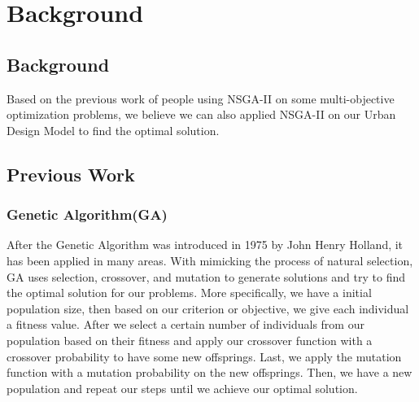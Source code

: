 \chapter{Background}
\label{chap:background}

\section{Background}
Based on the previous work of people using NSGA-II on some multi-objective optimization problems\cite{Magnier_2010_Multiobjective}, we believe we can also applied NSGA-II on our Urban Design Model to find the optimal solution. 

\section{Previous Work}

\subsection{Genetic Algorithm(GA)}
After the Genetic Algorithm was introduced in 1975 by John Henry Holland\cite{Holland_1975_Book}, it has been applied in many areas. With mimicking the process of natural selection, GA uses selection, crossover, and mutation to generate solutions and try to find the optimal solution for our problems. More specifically, we have a initial population size, then based on our criterion or objective, we give each individual a fitness value. After we select a certain number of individuals from our population based on their fitness and apply our crossover function with a crossover probability to have some new offsprings. Last, we apply the mutation function with a mutation probability on the new offsprings. Then, we have a new population and repeat our steps until we achieve our optimal solution.

